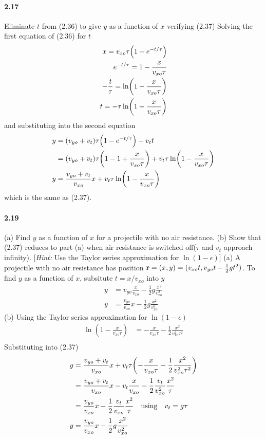 \documentclass[../problems.tex]{subfiles}
\begin{document}
\paragraph{2.17} Eliminate $t$ from (2.36) to give $y$ as a function of $x$ verifying (2.37)
\barh 
Solving the first equation of (2.36) for $t$ 
\begin{align*}
    x = v_{xo} \tau \quantity(1 - e ^{-t/\tau}) \\
    e^{-t/\tau} = 1 - \frac{x}{v_{xo} \tau} \\
    -\frac{t}{\tau} = \ln(1 - \frac{x}{v_{xo} \tau}) \\
    t = -\tau \ln (1 - \frac{x}{v_{xo} \tau})
\end{align*}
and substituting into the second equation
\begin{align*}
    y &= (v_{yo} + v_t) \tau \quantity(1 - e ^{-t/\tau}) - v_t t \\
    &= (v_{yo} + v_t)\tau\quantity(1 - 1+\frac{x}{v_{xo}\tau})+v_t\tau\ln(1-\frac{x}{v_{xo}\tau}) \\
    y &= \frac{v_{yo} + v_t}{v_{xo}} x + v_t \tau \ln (1 - \frac{x}{v_{xo} \tau})
\end{align*}
which is the same as (2.37).

\paragraph{2.19} (a) Find $y$ as a function of $x$ for a projectile with no air resistance. (b) Show
that (2.37) reduces to part (a) when air resistance is switched off($\tau$ and $v_t$ approach
infinity). [\textit{Hint:} Use the Taylor series approximation for $\ln(1 - \epsilon)$]
\barh
(a) A projectile with no air resistance has position $\vb r = (x, y) = (v_{xo}t, v_{yo}
t - \frac{1}{2}gt^2)$. To find $y$ as a function of $x$, subsitute $t = x/v_{xo}$ into $y$
\begin{align*}
    y &= v_{yo} \frac{x}{v_{xo}} - \frac{1}{2}g \frac{x^2}{v_{xo}^2} \\
    y &= \frac{v_{yo}}{v_{xo}} x - \frac{1}{2}g \frac{x^2}{v_{xo}^2}
\end{align*}
(b) Using the Taylor series approximation for $\ln(1 - \epsilon)$
\begin{align*}
    \ln(1- \frac{x}{v_{xo} \tau}) &= -\frac{x}{v_{xo} \tau} - \frac{1}{2} \frac{x^2}{v_{xo}^2
        \tau^2} \\
\end{align*}
Substituting into (2.37)
\begin{align*}
    y &= \frac{v_{yo} + v_t}{v_{xo}} x + v_t \tau \quantity(-\frac{x}{v_{xo} \tau} - \frac{1}{2}
        \frac{x^2}{v_{xo}^2 \tau^2})  \\
    &= \frac{v_{yo} + v_t}{v_{xo}} x - v_t \frac{x}{v_{xo}} - \frac{1}{2} \frac{v_t}{v_{xo}^2}
        \frac{x^2}{\tau} \\
    &= \frac{v_{yo}}{v_{xo}} x - \frac{1}{2} \frac{v_t}{v_{xo}} \frac{x^2}{\tau} \qusing 
        {v_t = g\tau} \\
    y &= \frac{v_{yo}}{v_{xo}} x - \frac{1}{2} g \frac{x^2}{v_{xo}^2} \\
\end{align*}
\end{document}
